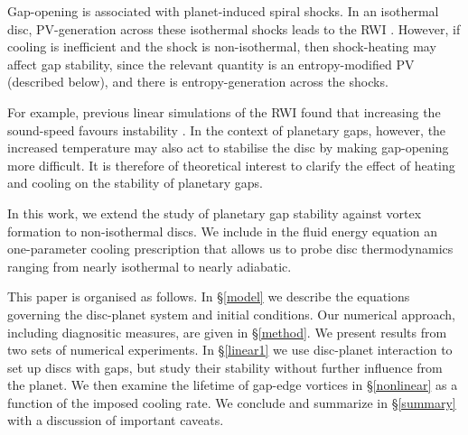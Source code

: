 \documentclass[useAMS,usenatbib]{mn2e}
\begin{document}
Gap-opening is associated with planet-induced spiral shocks. In an
isothermal disc, PV-generation across these isothermal shocks leads to
the RWI \citep{koller03,li05,valborro07,lin10}.    
However, if cooling is inefficient and the shock is non-isothermal,
then shock-heating may affect gap stability, since the
relevant quantity is an entropy-modified PV (described below), and
there is entropy-generation across the shocks. 

For example, previous
linear simulations of the RWI found  
that increasing the sound-speed favours instability \citep{li00,lin13}.  
In the context of
planetary gaps, however, the increased temperature may also act to
stabilise the disc by making gap-opening more difficult. It is 
therefore of theoretical interest to clarify the effect of heating and
cooling on the stability of planetary gaps. 

In this work, we extend the study of planetary gap stability against
vortex formation to non-isothermal discs. We include in the fluid energy
equation an one-parameter cooling prescription that allows us to probe
disc thermodynamics ranging from nearly isothermal to nearly
adiabatic.      

This paper is organised as follows. In \S\ref{model} we describe the
equations governing the disc-planet system and initial conditions. Our
numerical approach, including diagnositic measures, are given in
\S\ref{method}. We present results from two sets of numerical
experiments. In \S\ref{linear1} we use disc-planet interaction to set
up discs with gaps, but study their stability without further
influence from the planet. %
We then examine the lifetime of gap-edge vortices in \S\ref{nonlinear}
as a function of the imposed cooling rate. We conclude and summarize
in \S\ref{summary} with a discussion of important caveats. 





%






\appendix
%
%
\end{document}
